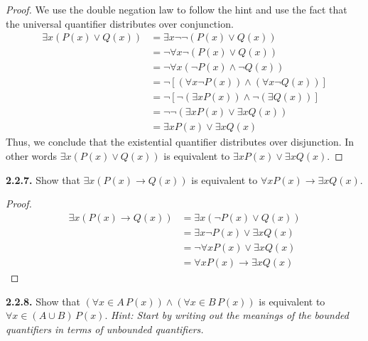 \documentclass[12pt]{amsart}
\newenvironment{statement}[1]{\smallskip\noindent\color[rgb]{.6627, .3529, .6314} {\bf #1.}}{}
\theoremstyle{definition}
\theoremstyle{remark}
\begin{document}
\begin{proof}
We use the double negation law to follow the hint and use the fact that the universal quantifier distributes over conjunction.
\begin{align*}
	\exists x (P(x) \vee Q(x))
	&= \exists x \neg \neg (P(x) \vee Q(x)) \\
	&= \neg \forall x \neg (P(x) \vee Q(x)) \\
	&= \neg \forall x (\neg P(x) \wedge \neg Q(x)) \\
	&= \neg [(\forall x \neg P(x)) \wedge (\forall x \neg Q(x))] \\
	&= \neg [\neg (\exists x P(x)) \wedge \neg (\exists Q(x))] \\
	&= \neg \neg (\exists x P(x) \vee \exists x Q(x)) \\
	&= \exists x P(x) \vee \exists x Q(x)
\end{align*}
Thus, we conclude that the existential quantifier distributes over disjunction.
In other words $\exists x (P(x) \vee Q(x))$ is equivalent to $\exists x P(x) \vee \exists x Q(x)$.
\end{proof}


\begin{statement}{2.2.7}
Show that $\exists x (P(x) \rightarrow Q(x))$ is equivalent to $\forall x P(x) \rightarrow \exists x Q(x)$.
\end{statement}

\begin{proof}
\begin{align*}
	\exists x (P(x) \rightarrow Q(x))
	&= \exists x (\neg P(x) \vee Q(x)) \\
	&= \exists x \neg P(x) \vee \exists x Q(x) \\
	&= \neg \forall x P(x) \vee \exists x Q(x) \\
	&= \forall x P(x) \rightarrow \exists x Q(x)
\end{align*}
\end{proof}


\begin{statement}{2.2.8}
Show that $(\forall x \in A \, P(x)) \wedge (\forall x \in B \, P(x))$ is equivalent to $\forall x \in (A \cup B) \, P(x)$.
\emph{Hint: Start by writing out the meanings of the bounded quantifiers in terms of unbounded quantifiers.}
\end{statement}
\end{document}
